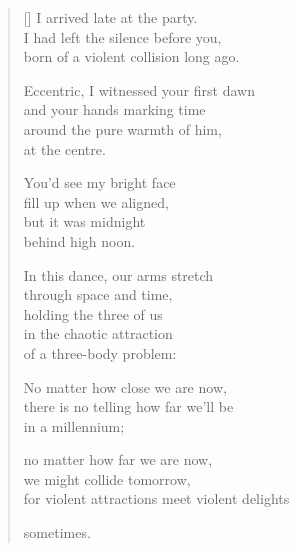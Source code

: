 \documentclass[12pt,a4paper]{article}
\begin{document}
\thispagestyle{empty}


\settowidth{\versewidth}{for violent attractions meet violent delights}

\bigskip

\begin{verse}[\versewidth]
  I arrived late at the party. \\
  I had left the silence before you, \\
  born of a violent collision long ago.

  Eccentric, I witnessed your first dawn \\
  and your hands marking time \\
  around the pure warmth of him, \\
  at the centre.

  You'd see my bright face \\
  fill up when we aligned, \\
  but it was midnight \\
  behind high noon.

  In this dance, our arms stretch \\
  through space and time, \\
  holding the three of us \\
  in the chaotic attraction \\
  of a three-body problem:

  No matter how close we are now, \\
  there is no telling how far we'll be \\
  in a millennium;

  no matter how far we are now, \\
  we might collide tomorrow, \\
  for violent attractions meet violent delights

  sometimes.
\end{verse}
\end{document}
